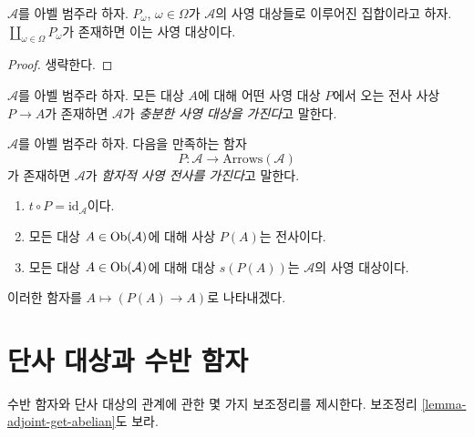\begin{lemma}
\label{lemma-coproduct-projectives}
$\mathcal{A}$를 아벨 범주라 하자. $P_\omega$, $\omega \in \Omega$가
$\mathcal{A}$의 사영 대상들로 이루어진 집합이라고 하자.
$\coprod_{\omega \in \Omega} P_\omega$가 존재하면 이는 사영 대상이다.
\end{lemma}

\begin{proof}
생략한다.
\end{proof}

\begin{definition}
\label{definition-enough-projectives}
$\mathcal{A}$를 아벨 범주라 하자. 모든 대상 $A$에 대해 어떤 사영 대상
$P$에서 오는 전사 사상 $P \to A$가 존재하면 $\mathcal{A}$가
{\it 충분한 사영 대상을 가진다}고 말한다.
\end{definition}

\begin{definition}
\label{definition-functorial-projective-surjections}
$\mathcal{A}$를 아벨 범주라 하자. 다음을 만족하는 함자
$$
P : \mathcal{A} \longrightarrow \text{Arrows}(\mathcal{A})
$$
가 존재하면 $\mathcal{A}$가 {\it 함자적 사영 전사를 가진다}고
말한다.
\begin{enumerate}
\item $t \circ P = \text{id}_\mathcal{A}$이다.
\item 모든 대상 $A \in \mathop{\mathrm{Ob}}\nolimits(\mathcal{A})$에 대해 사상 $P(A)$는
전사이다.
\item 모든 대상 $A \in \mathop{\mathrm{Ob}}\nolimits(\mathcal{A})$에 대해 대상 $s(P(A))$는
$\mathcal{A}$의 사영 대상이다.
\end{enumerate}
이러한 함자를 $A \mapsto (P(A) \to A)$로 나타내겠다.
\end{definition}

\section{단사 대상과 수반 함자}
\label{section-adjoint}

\noindent
수반 함자와 단사 대상의 관계에 관한 몇 가지 보조정리를 제시한다.
보조정리 \ref{lemma-adjoint-get-abelian}도 보라.

